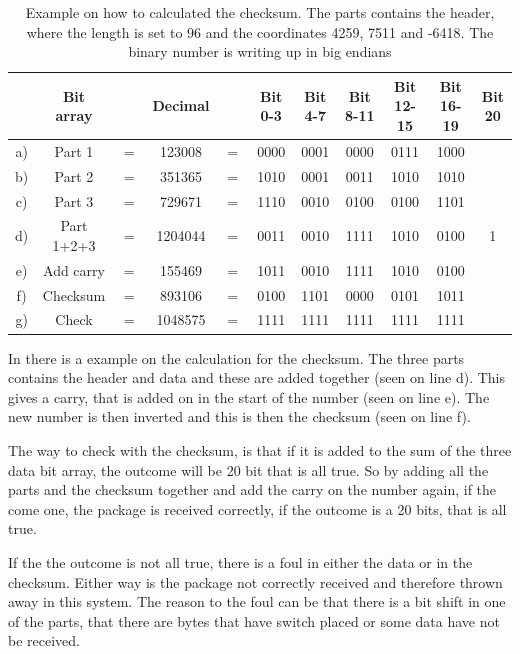 \begin{table}[H]
\centering
\begin{tabular}{c c c c c c c c c c c}
   & Bit array  &     & Decimal &     & Bit 0-3 & Bit 4-7 & Bit 8-11 & Bit 12-15 & Bit 16-19 & Bit 20 \\
\hline
a) & Part 1     & $=$ & 123008  & $=$ & 0000 & 0001 & 0000 & 0111 & 1000 & \\
b) & Part 2     & $=$ & 351365  & $=$ & 1010 & 0001 & 0011 & 1010 & 1010 & \\
c) & Part 3     & $=$ & 729671  & $=$ & 1110 & 0010 & 0100 & 0100 & 1101 & \\
d) & Part 1+2+3 & $=$ & 1204044 & $=$ & 0011 & 0010 & 1111 & 1010 & 0100 & 1 \\
e) & Add carry  & $=$ & 155469  & $=$ & 1011 & 0010 & 1111 & 1010 & 0100 & \\
f) & Checksum   & $=$ & 893106  & $=$ & 0100 & 1101 & 0000 & 0101 & 1011 & \\
g) & Check      & $=$ & 1048575 & $=$ & 1111 & 1111 & 1111 & 1111 & 1111 & \\
\end{tabular}
\caption{Example on how to calculated the checksum. The parts contains the header, where the length is set to 96 and the coordinates 4259, 7511 and -6418. The binary number is writing up in big endians}
\label{ChecksumExp}
\end{table}

In  there is a example on the calculation for the checksum. The three parts contains the header and data and these are added together (seen on line d). This gives a carry, that is added on in the start of the number (seen on line e). The new number is then inverted and this is then the checksum (seen on line f).

The way to check with the checksum, is that if it is added to the sum of the three data bit array, the outcome will be 20 bit that is all true. So by adding all the parts and the checksum together and add the carry on the number again, if the come one, the package is received correctly, if the outcome is a 20 bits, that is all true.

If the the outcome is not all true, there is a foul in either the data or in the checksum. Either way is the package not correctly received and therefore thrown away in this system. The reason to the foul can be that there is a bit shift in one of the parts, that there are bytes that have switch placed or some data have not be received. 

